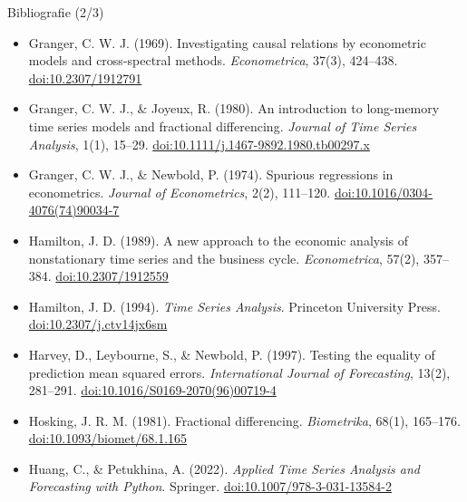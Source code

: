 \begin{frame}{Bibliografie (2/3)}
\itemsize{\scriptsize}
\begin{itemize}
    \item Granger, C. W. J. (1969). Investigating causal relations by econometric models and cross-spectral methods. \textit{Econometrica}, 37(3), 424--438. \href{https://doi.org/10.2307/1912791}{doi:10.2307/1912791}
    \item Granger, C. W. J., \& Joyeux, R. (1980). An introduction to long-memory time series models and fractional differencing. \textit{Journal of Time Series Analysis}, 1(1), 15--29. \href{https://doi.org/10.1111/j.1467-9892.1980.tb00297.x}{doi:10.1111/j.1467-9892.1980.tb00297.x}
    \item Granger, C. W. J., \& Newbold, P. (1974). Spurious regressions in econometrics. \textit{Journal of Econometrics}, 2(2), 111--120. \href{https://doi.org/10.1016/0304-4076(74)90034-7}{doi:10.1016/0304-4076(74)90034-7}
    \item Hamilton, J. D. (1989). A new approach to the economic analysis of nonstationary time series and the business cycle. \textit{Econometrica}, 57(2), 357--384. \href{https://doi.org/10.2307/1912559}{doi:10.2307/1912559}
    \item Hamilton, J. D. (1994). \textit{Time Series Analysis}. Princeton University Press. \href{https://doi.org/10.2307/j.ctv14jx6sm}{doi:10.2307/j.ctv14jx6sm}
    \item Harvey, D., Leybourne, S., \& Newbold, P. (1997). Testing the equality of prediction mean squared errors. \textit{International Journal of Forecasting}, 13(2), 281--291. \href{https://doi.org/10.1016/S0169-2070(96)00719-4}{doi:10.1016/S0169-2070(96)00719-4}
    \item Hosking, J. R. M. (1981). Fractional differencing. \textit{Biometrika}, 68(1), 165--176. \href{https://doi.org/10.1093/biomet/68.1.165}{doi:10.1093/biomet/68.1.165}
    \item Huang, C., \& Petukhina, A. (2022). \textit{Applied Time Series Analysis and Forecasting with Python}. Springer. \href{https://doi.org/10.1007/978-3-031-13584-2}{doi:10.1007/978-3-031-13584-2}
\end{itemize}
\end{frame}

